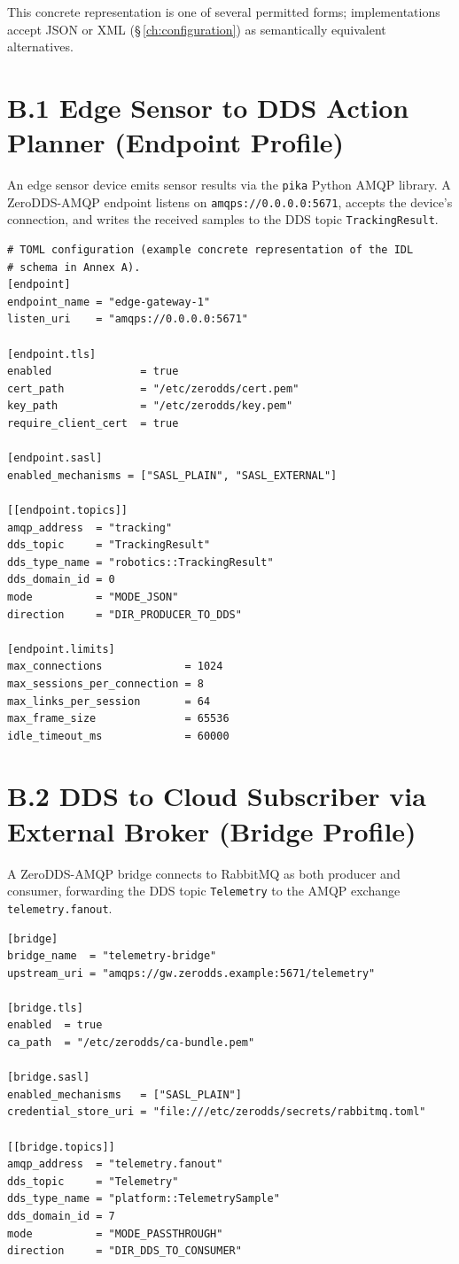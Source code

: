\documentclass{../styles/zerodds-vendor-spec}
\begin{document}
This concrete representation is one of several permitted forms;
implementations  accept JSON or XML
(\S\,\ref{ch:configuration}) as semantically equivalent
alternatives.

\section*{B.1 Edge Sensor to DDS Action Planner (Endpoint Profile)}

An edge sensor device emits sensor results via the
\texttt{pika} Python AMQP library. A ZeroDDS-AMQP endpoint listens
on \texttt{amqps://0.0.0.0:5671}, accepts the device's connection,
and writes the received samples to the DDS topic
\texttt{TrackingResult}.

\begin{lstlisting}
# TOML configuration (example concrete representation of the IDL
# schema in Annex A).
[endpoint]
endpoint_name = "edge-gateway-1"
listen_uri    = "amqps://0.0.0.0:5671"

[endpoint.tls]
enabled              = true
cert_path            = "/etc/zerodds/cert.pem"
key_path             = "/etc/zerodds/key.pem"
require_client_cert  = true

[endpoint.sasl]
enabled_mechanisms = ["SASL_PLAIN", "SASL_EXTERNAL"]

[[endpoint.topics]]
amqp_address  = "tracking"
dds_topic     = "TrackingResult"
dds_type_name = "robotics::TrackingResult"
dds_domain_id = 0
mode          = "MODE_JSON"
direction     = "DIR_PRODUCER_TO_DDS"

[endpoint.limits]
max_connections             = 1024
max_sessions_per_connection = 8
max_links_per_session       = 64
max_frame_size              = 65536
idle_timeout_ms             = 60000
\end{lstlisting}

\section*{B.2 DDS to Cloud Subscriber via External Broker (Bridge Profile)}

A ZeroDDS-AMQP bridge connects to RabbitMQ as both producer and
consumer, forwarding the DDS topic \texttt{Telemetry} to the AMQP
exchange \texttt{telemetry.fanout}.

\begin{lstlisting}
[bridge]
bridge_name  = "telemetry-bridge"
upstream_uri = "amqps://gw.zerodds.example:5671/telemetry"

[bridge.tls]
enabled  = true
ca_path  = "/etc/zerodds/ca-bundle.pem"

[bridge.sasl]
enabled_mechanisms   = ["SASL_PLAIN"]
credential_store_uri = "file:///etc/zerodds/secrets/rabbitmq.toml"

[[bridge.topics]]
amqp_address  = "telemetry.fanout"
dds_topic     = "Telemetry"
dds_type_name = "platform::TelemetrySample"
dds_domain_id = 7
mode          = "MODE_PASSTHROUGH"
direction     = "DIR_DDS_TO_CONSUMER"
\end{lstlisting}
\end{document}
